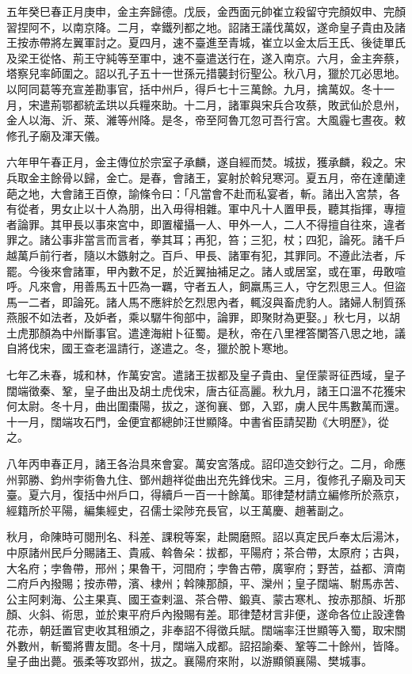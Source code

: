\begin{pinyinscope}
 五年癸巳春正月庚申，金主奔歸德。戊辰，金西面元帥崔立殺留守完顏奴申、完顏習捏阿不，以南京降。二月，幸鐵列都之地。詔諸王議伐萬奴，遂命皇子貴由及諸王按赤帶將左翼軍討之。夏四月，速不臺進至青城，崔立以金太后王氏、後徒單氏及梁王從恪、荊王守純等至軍中，速不臺遣送行在，遂入南京。六月，金主奔蔡，塔察兒率師圍之。詔以孔子五十一世孫元措襲封衍聖公。秋八月，獵於兀必思地。以阿同葛等充宣差勘事官，括中州戶，得戶七十三萬餘。九月，擒萬奴。冬十一月，宋遣荊鄂都統孟珙以兵糧來助。十二月，諸軍與宋兵合攻蔡，敗武仙於息州，金人以海、沂、萊、濰等州降。是冬，帝至阿魯兀忽可吾行宮。大風霾七晝夜。敕修孔子廟及渾天儀。



 六年甲午春正月，金主傳位於宗室子承麟，遂自經而焚。城拔，獲承麟，殺之。宋兵取金主餘骨以歸，金亡。是春，會諸王，宴射於斡兒寒河。夏五月，帝在達蘭達葩之地，大會諸王百僚，諭條令曰：「凡當會不赴而私宴者，斬。諸出入宮禁，各有從者，男女止以十人為朋，出入毋得相雜。軍中凡十人置甲長，聽其指揮，專擅者論罪。其甲長以事來宮中，即置權攝一人、甲外一人，二人不得擅自往來，違者罪之。諸公事非當言而言者，拳其耳；再犯，笞；三犯，杖；四犯，論死。諸千戶越萬戶前行者，隨以木鏃射之。百戶、甲長、諸軍有犯，其罪同。不遵此法者，斥罷。今後來會諸軍，甲內數不足，於近翼抽補足之。諸人或居室，或在軍，毋敢喧呼。凡來會，用善馬五十匹為一羈，守者五人，飼羸馬三人，守乞烈思三人。但盜馬一二者，即論死。諸人馬不應絆於乞烈思內者，輒沒與畜虎豹人。諸婦人制質孫燕服不如法者，及妒者，乘以驏牛徇部中，論罪，即聚財為更娶。」秋七月，以胡土虎那顏為中州斷事官。遣達海紺卜征蜀。是秋，帝在八里裡答闌答八思之地，議自將伐宋，國王查老溫請行，遂遣之。冬，獵於脫卜寒地。



 七年乙未春，城和林，作萬安宮。遣諸王拔都及皇子貴由、皇侄蒙哥征西域，皇子闊端徵秦、鞏，皇子曲出及胡土虎伐宋，唐古征高麗。秋九月，諸王口溫不花獲宋何太尉。冬十月，曲出圍棗陽，拔之，遂徇襄、鄧，入郢，虜人民牛馬數萬而還。十一月，闊端攻石門，金便宜都總帥汪世顯降。中書省臣請契勘《大明歷》，從之。



 八年丙申春正月，諸王各治具來會宴。萬安宮落成。詔印造交鈔行之。二月，命應州郭勝、鈞州孛術魯九住、鄧州趙祥從曲出充先鋒伐宋。三月，復修孔子廟及司天臺。夏六月，復括中州戶口，得續戶一百一十餘萬。耶律楚材請立編修所於燕京，經籍所於平陽，編集經史，召儒士梁陟充長官，以王萬慶、趙著副之。



 秋月，命陳時可閱刑名、科差、課稅等案，赴闕磨照。詔以真定民戶奉太后湯沐，中原諸州民戶分賜諸王、貴戚、斡魯朵：拔都，平陽府；茶合帶，太原府；古與，大名府；孛魯帶，邢州；果魯干，河間府；孛魯古帶，廣寧府；野苦，益都、濟南二府戶內撥賜；按赤帶，濱、棣州；斡陳那顏，平、灤州；皇子闊端、駙馬赤苦、公主阿剌海、公主果真、國王查剌溫、茶合帶、鍛真、蒙古寒札、按赤那顏、圻那顏、火斜、術思，並於東平府戶內撥賜有差。耶律楚材言非便，遂命各位止設達魯花赤，朝廷置官吏收其租頒之，非奉詔不得徵兵賦。闊端率汪世顯等入蜀，取宋關外數州，斬蜀將曹友聞。冬十月，闊端入成都。詔招諭秦、鞏等二十餘州，皆降。皇子曲出薨。張柔等攻郢州，拔之。襄陽府來附，以游顯領襄陽、樊城事。




\end{pinyinscope}
